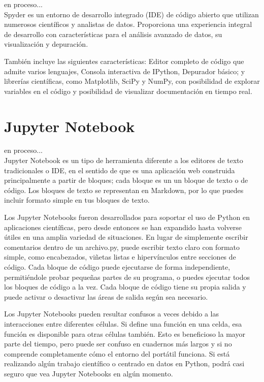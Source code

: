 en proceso...\\

Spyder es un entorno de desarrollo integrado (IDE) de código abierto que utilizan numerosos científicos y analistas de datos. Proporciona una experiencia integral de desarrollo con características para el análisis avanzado de datos, su visualización y depuración. 

También incluye las siguientes características:  Editor completo de código que admite varios lenguajes, Consola interactiva de IPython, Depurador básico; y librerías científicas, como Matplotlib, SciPy y NumPy,  con posibilidad de explorar variables en el código
y posibilidad de visualizar documentación en tiempo real.\\


\section*{Jupyter Notebook}

en proceso...\\

Jupyter Notebook es un tipo de herramienta diferente a los editores de texto tradicionales o
IDE, en el sentido de que es una aplicación web construida principalmente a partir de bloques; cada bloque es un
un bloque de texto o de código. Los bloques de texto se representan en Markdown, por lo que puedes incluir formato simple 
en tus bloques de texto.

Los Jupyter Notebooks fueron desarrollados para soportar el uso de Python en
aplicaciones científicas, pero desde entonces se han expandido hasta volverse útiles en
una amplia variedad de situaciones. En lugar de simplemente escribir comentarios dentro de un archivo.py, puede escribir texto claro con formato simple, como encabezados, viñetas listas e hipervínculos entre secciones de código.
Cada bloque de código puede ejecutarse de forma independiente, permitiéndole probar pequeñas partes de su programa, o
puedes ejecutar todos los bloques de código a la vez. Cada bloque de código tiene su propia salida y puede activar o desactivar las áreas de salida según sea necesario.

Los Jupyter Notebooks pueden resultar confusos a veces debido a las interacciones
entre diferentes células. Si define una función en una celda, esa función es
disponible para otras células también. Esto es beneficioso la mayor parte del tiempo, pero puede
ser confuso en cuadernos más largos y si no comprende completamente cómo el entorno del portátil funciona.
Si está realizando algún trabajo científico o centrado en datos en Python, podrá casi seguro que vea Jupyter Notebooks en algún momento.\\







